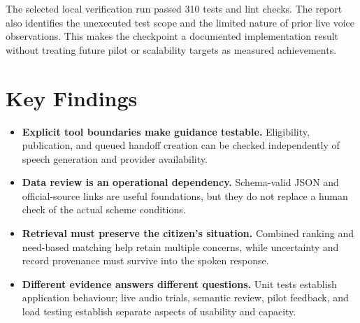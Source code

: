 \documentclass[11pt,a4paper,oneside]{report}
\begin{document}
The selected local verification run passed 310 tests and lint checks. The report
also identifies the unexecuted test scope and the limited nature of prior live
voice observations. This makes the checkpoint a documented implementation result
without treating future pilot or scalability targets as measured achievements.

\section{Key Findings}
\begin{itemize}
  \item \textbf{Explicit tool boundaries make guidance testable.} Eligibility,
    publication, and queued handoff creation can be checked independently of
    speech generation and provider availability.
  \item \textbf{Data review is an operational dependency.} Schema-valid JSON and
    official-source links are useful foundations, but they do not replace a
    human check of the actual scheme conditions.
  \item \textbf{Retrieval must preserve the citizen's situation.} Combined
    ranking and need-based matching help retain multiple concerns, while
    uncertainty and record provenance must survive into the spoken response.
  \item \textbf{Different evidence answers different questions.} Unit tests
    establish application behaviour; live audio trials, semantic review, pilot
    feedback, and load testing establish separate aspects of usability and capacity.
\end{itemize}

\clearpage
\end{document}
